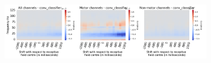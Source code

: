 \begin{figure}[!htpb]
\begin{subfigure}[b]{\textwidth}
   \includegraphics[width=1\linewidth]{img/appendix/C/m/absVel/sbp0_m_shift_gradients_conv_classifier_all_kinds}
   \caption{}
   \label{fig:absVel-shifting-grads-conv-classifier}
\end{subfigure}

\caption[]{}
\label{fig:absVel-shifting-grads}
\end{figure}


